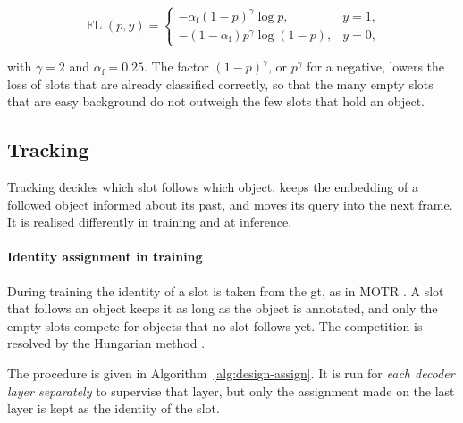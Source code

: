 \begin{equation}
    \operatorname{FL}(p, y) =
    \begin{cases}
        -\alpha_{\mathrm{f}} \left( 1 - p \right)^{\gamma} \log p, & y = 1, \\[0.4em]
        -\left( 1 - \alpha_{\mathrm{f}} \right) p^{\gamma} \log \left( 1 - p \right), & y = 0,
    \end{cases}
    \label{eq:design-focal}
\end{equation}

with $\gamma = 2$ and $\alpha_{\mathrm{f}} = 0.25$. The factor $(1 - p)^{\gamma}$, or $p^{\gamma}$ for a
negative, lowers the loss of slots that are already classified correctly, so that the many empty slots that are
easy background do not outweigh the few slots that hold an object.

\subsection{Tracking}
\label{subsec:design-tracking}

Tracking decides which slot follows which object, keeps the embedding of a followed object informed about
its past, and moves its query into the next frame. It is realised differently in training and at inference.

\paragraph{Identity assignment in training}
During training the identity of a slot is taken from the \ac{gt}, as in MOTR \cite{Zeng2022MOTR}. 
A slot that follows an object keeps it as long as the object is annotated, and only the empty slots compete for objects that no slot
follows yet. The competition is resolved by the Hungarian method \cite{Kuhn1955Hungarian}.

The procedure is given in
Algorithm~\ref{alg:design-assign}. It is run for \emph{each decoder layer separately} to supervise that layer, but
only the assignment made on the last layer is kept as the identity of the slot.

